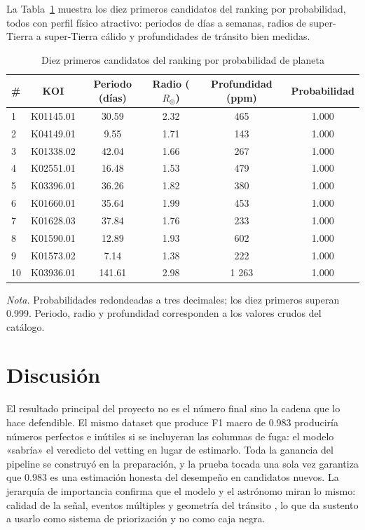 \documentclass[a4paper,12pt]{article}
\begin{document}
  La Tabla~\ref{tab:top10} muestra los diez primeros candidatos del ranking por
  probabilidad, todos con perfil físico atractivo: periodos de días a semanas,
  radios de super-Tierra a super-Tierra cálido y profundidades de tránsito bien
  medidas.

  \begin{table}[H]
    \caption{Diez primeros candidatos del ranking por probabilidad de planeta}
    \label{tab:top10}
    \begin{tabular}{@{}lccccc@{}}
      \toprule
      \# & KOI & Periodo (días) & Radio ($R_{\oplus}$) & Profundidad (ppm) & Probabilidad \\
      \midrule
      1 & K01145.01 & 30.59 & 2.32 & 465 & 1.000 \\
      2 & K04149.01 & 9.55 & 1.71 & 143 & 1.000 \\
      3 & K01338.02 & 42.04 & 1.66 & 267 & 1.000 \\
      4 & K02551.01 & 16.48 & 1.53 & 479 & 1.000 \\
      5 & K03396.01 & 36.26 & 1.82 & 380 & 1.000 \\
      6 & K01660.01 & 35.64 & 1.99 & 453 & 1.000 \\
      7 & K01628.03 & 37.84 & 1.76 & 233 & 1.000 \\
      8 & K01590.01 & 12.89 & 1.93 & 602 & 1.000 \\
      9 & K01573.02 & 7.14 & 1.38 & 222 & 1.000 \\
      10 & K03936.01 & 141.61 & 2.98 & 1 263 & 1.000 \\
      \bottomrule
    \end{tabular}
    \par\medskip
    \begin{minipage}{\linewidth}
      \footnotesize\textit{Nota.} Probabilidades redondeadas a tres decimales; los
      diez primeros superan 0.999. Periodo, radio y profundidad corresponden a los
      valores crudos del catálogo.
    \end{minipage}
  \end{table}

  \section{Discusión}

  El resultado principal del proyecto no es el número final sino la cadena que lo
  hace defendible. El mismo dataset que produce F1 macro de 0.983 produciría
  números perfectos e inútiles si se incluyeran las columnas de fuga: el modelo
  «sabría» el veredicto del vetting en lugar de estimarlo. Toda la ganancia del
  pipeline se construyó en la preparación, y la prueba tocada una sola vez
  garantiza que 0.983 es una estimación honesta del desempeño en candidatos
  nuevos. La jerarquía de importancia confirma que el modelo y el astrónomo
  miran lo mismo: calidad de la señal, eventos múltiples y geometría del
  tránsito \cite{thompson2018}, lo que da sustento a usarlo como sistema de
  priorización y no como caja negra.
\end{document}
